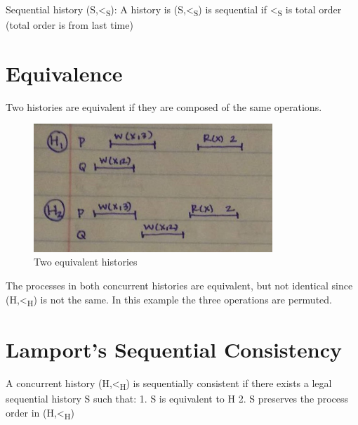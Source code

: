 \documentclass[twoside]{article}
\begin{document}
Sequential history (S,\textless\textsubscript{S}): A history is (S,\textless\textsubscript{S}) is sequential if \textless\textsubscript{S} is total order (total order is from last time)

\section{Equivalence}

Two histories are equivalent  if they are composed of the same operations.
\begin{figure}[ht!]
\centering
\includegraphics[width=90mm]{pic_1.jpg}
\caption{Two equivalent histories \label{overflow}}
\end{figure}
The processes in both concurrent histories are equivalent, but not identical since (H,\textless\textsubscript{H}) is not the same. In this example the three operations are permuted.

\section{Lamport’s Sequential Consistency}

A concurrent history (H,\textless\textsubscript{H}) is sequentially consistent if there exists a legal sequential history S such that:
1.	S is equivalent to H         2.	S preserves the process order in (H,\textless\textsubscript{H})
\end{document}
